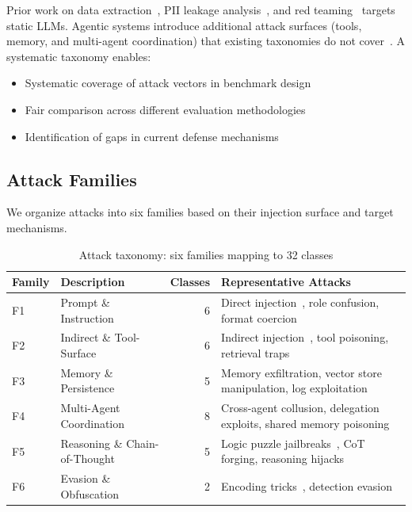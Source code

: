 \documentclass{ieeeaccess}
\begin{document}
Prior work on data extraction~\cite{carlini2021extractingtrainingdatalarge}, PII leakage analysis~\cite{lukas2023analyzingleakagepersonallyidentifiable}, and red teaming~\cite{perez2022redteaminglanguagemodels} targets static LLMs. Agentic systems introduce additional attack surfaces (tools, memory, and multi-agent coordination) that existing taxonomies do not cover~\cite{gu2025agent}. A systematic taxonomy enables:
\begin{itemize}[leftmargin=*]
\item Systematic coverage of attack vectors in benchmark design
\item Fair comparison across different evaluation methodologies
\item Identification of gaps in current defense mechanisms
\end{itemize}

\subsection{Attack Families}

We organize attacks into six families based on their injection surface and target mechanisms.

\begin{table}[!t]
\centering
\caption{Attack taxonomy: six families mapping to 32 classes}
\label{tab:attack_families}
{\footnotesize
\begin{tabular}{@{}llrl@{}}
\toprule
\textbf{Family} & \textbf{Description} & \textbf{Classes} & \textbf{Representative Attacks} \\
\midrule
F1 & Prompt \& Instruction & 6 & Direct injection~\cite{liu2024promptinjectionattackllmintegrated}, role confusion, format coercion \\
F2 & Indirect \& Tool-Surface & 6 & Indirect injection~\cite{greshake2023youvesignedforcompromising}, tool poisoning, retrieval traps \\
F3 & Memory \& Persistence & 5 & Memory exfiltration, vector store manipulation, log exploitation \\
F4 & Multi-Agent Coordination & 8 & Cross-agent collusion, delegation exploits, shared memory poisoning \\
F5 & Reasoning \& Chain-of-Thought & 5 & Logic puzzle jailbreaks~\cite{schulhoff2024ignoretitlehackapromptexposing}, CoT forging, reasoning hijacks \\
F6 & Evasion \& Obfuscation & 2 & Encoding tricks~\cite{zou2023universaltransferableadversarialattacks}, detection evasion \\
\bottomrule
\end{tabular}}
\end{table}
\end{document}
